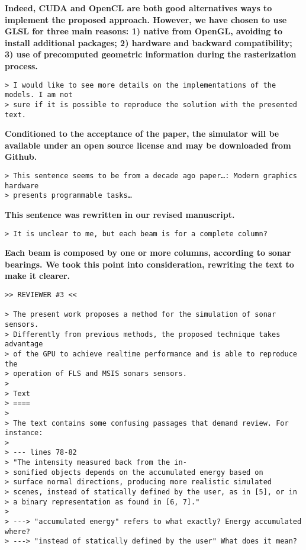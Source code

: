 \documentclass{article}
\begin{document}
\textbf{Indeed, CUDA and OpenCL are both good alternatives ways to implement
the proposed approach. However, we have chosen to use GLSL for three main reasons:
1) native from OpenGL, avoiding to install additional packages;
2) hardware and backward compatibility;
3) use of precomputed geometric information during the rasterization process.}

\begin{verbatim}
> I would like to see more details on the implementations of the models. I am not
> sure if it is possible to reproduce the solution with the presented text.
\end{verbatim}

\textbf{Conditioned to the acceptance of the paper, the simulator will be available
under an open source license and may be downloaded from Github.}

\begin{verbatim}
> This sentence seems to be from a decade ago paper…: Modern graphics hardware
> presents programmable tasks…
\end{verbatim}

\textbf{This sentence was rewritten in our revised manuscript.}

\begin{verbatim}
> It is unclear to me, but each beam is for a complete column?
\end{verbatim}

\textbf{Each beam is composed by one or more columns, according to sonar
bearings. We took this point into consideration, rewriting the text to make
it clearer.}

\begin{verbatim}
>> REVIEWER #3 <<

> The present work proposes a method for the simulation of sonar sensors.
> Differently from previous methods, the proposed technique takes advantage
> of the GPU to achieve realtime performance and is able to reproduce the
> operation of FLS and MSIS sonars sensors.
>
> Text
> ====
>
> The text contains some confusing passages that demand review. For instance:
>
> --- lines 78-82
> "The intensity measured back from the in-
> sonified objects depends on the accumulated energy based on
> surface normal directions, producing more realistic simulated
> scenes, instead of statically defined by the user, as in [5], or in
> a binary representation as found in [6, 7]."
>
> ---> "accumulated energy" refers to what exactly? Energy accumulated where?
> ---> "instead of statically defined by the user" What does it mean?
\end{verbatim}
\end{document}
